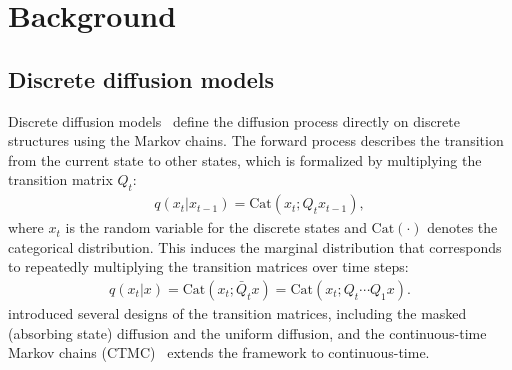 \section{Background}


\subsection{Discrete diffusion models}
Discrete diffusion models~\citep{austin2021d3pm,lou2024sedd,sahoo2024simple,shi2024md4} define the diffusion process directly on discrete structures using the Markov chains. The forward process describes the transition from the current state to other states, which is formalized by multiplying
the transition matrix $Q_t$:
\begin{align}
    q(x_t|x_{t-1}) = \text{Cat}(x_t; {Q}_t x_{t-1}),
\end{align}
where $x_t$ is the random variable for the discrete states and $\text{Cat}(\cdot)$ denotes the categorical distribution. This induces the marginal distribution that corresponds to repeatedly multiplying the transition matrices over time steps:
\begin{align}
    q(x_t|x)  = \text{Cat}(x_t; \bar{Q}_t x) = \text{Cat}(x_t;Q_t\cdots Q_1 x).
\label{eq:discrete_transition}
\end{align}
\citet{austin2021d3pm} introduced several designs of the transition matrices, including the masked (absorbing state) diffusion and the uniform diffusion, and the continuous-time Markov chains (CTMC)~\citep{austin2021d3pm,campbell2022ctmc} extends the framework to continuous-time.



